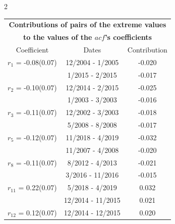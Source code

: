 
\thispagestyle{empty}
\begin{multicols}{2}{ 
\begin{tabular}{ccc}
\multicolumn{3}{c}{\textbf{Contributions of pairs of the extreme values} }  \vspace{-.10in}  \\ 
\multicolumn{3}{c}{ \textbf{to the values of the $acf$'s coefficients}} \\ 
\hline 
\hline                  Coefficient  &  Dates &  Contribution \\ 
\hline 
  $r_{ 1}$ = -0.08(0.07) &      12/2004 -  1/2005 &       -0.020    \vspace{-.10in} \\ 
  &        1/2015 -  2/2015 &       -0.017  \vspace{-.02in}   \\ \hline 
    $r_{ 2}$ = -0.10(0.07) &      12/2014 -  2/2015 &       -0.025    \vspace{-.10in} \\ 
  &        1/2003 -  3/2003 &       -0.016  \vspace{-.02in}   \\ \hline 
    $r_{ 3}$ = -0.11(0.07) &      12/2002 -  3/2003 &       -0.018    \vspace{-.10in} \\ 
  &        5/2008 -  8/2008 &       -0.017  \vspace{-.02in}   \\ \hline 
    $r_{ 5}$ = -0.12(0.07) &      11/2018 -  4/2019 &       -0.032    \vspace{-.10in} \\ 
  &       11/2007 -  4/2008 &       -0.020  \vspace{-.02in}   \\ \hline 
    $r_{ 8}$ = -0.11(0.07) &       8/2012 -  4/2013 &       -0.021    \vspace{-.10in} \\ 
  &        3/2016 - 11/2016 &       -0.015  \vspace{-.02in}   \\ \hline 
    $r_{11}$ = 0.22(0.07) &       5/2018 -  4/2019 &        0.032   \vspace{-.10in} \\  
&       12/2014 - 11/2015 &        0.021  \vspace{-.02in} \\ \hline 
  $r_{12}$ = 0.12(0.07) &      12/2014 - 12/2015 &        0.020   \vspace{-.10in} \\  

\end{tabular}}
\end{multicols}
